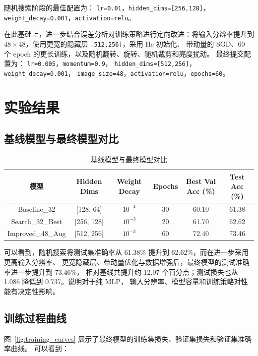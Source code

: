 \documentclass[12pt,a4paper,fontset=none]{ctexart}
\begin{document}
随机搜索阶段的最佳配置为：
\texttt{lr=0.01}，\texttt{hidden\_dims=[256,128]}，
\texttt{weight\_decay=0.001}，\texttt{activation=relu}。

在此基础上，进一步结合误差分析对训练策略进行定向改进：将输入分辨率提升到
$48 \times 48$，使用更宽的隐藏层 \texttt{[512,256]}，采用 He 初始化、
带动量的 SGD、60 个 epoch 的更长训练，以及随机翻转、旋转、随机裁剪和亮度扰动。
最终提交配置为：
\texttt{lr=0.005}，\texttt{momentum=0.9}，
\texttt{hidden\_dims=[512,256]}，\texttt{weight\_decay=0.001}，
\texttt{image\_size=48}，\texttt{activation=relu}，\texttt{epochs=60}。

\section{实验结果}

\subsection{基线模型与最终模型对比}

\begin{table}[htbp]
\centering
\begin{tabular}{|c|c|c|c|c|c|}
\hline
模型 & Hidden Dims & Weight Decay & Epochs & Best Val Acc (\%) & Test Acc (\%) \\
\hline
Baseline\_32 & [128, 64] & $10^{-4}$ & 30 & 60.10 & 61.38 \\
Search\_32\_Best & [256, 128] & $10^{-3}$ & 20 & 61.70 & 62.62 \\
Improved\_48\_Aug & [512, 256] & $10^{-3}$ & 60 & 72.40 & 73.46 \\
\hline
\end{tabular}
\caption{基线模型与最终模型对比}
\label{tab:baseline_final}
\end{table}

可以看到，随机搜索将测试集准确率从 61.38\% 提升到 62.62\%，而在进一步采用更高输入分辨率、
更宽隐藏层、带动量优化与数据增强后，最终模型的测试准确率进一步提升到 73.46\%，
相对基线共提升约 12.07 个百分点；测试损失也从 1.086 降低到 0.737。说明对于纯 MLP，
输入分辨率、模型容量和训练策略对性能有决定性影响。

\subsection{训练过程曲线}

图~\ref{fig:training_curves} 展示了最终模型的训练集损失、验证集损失和验证集准确率曲线。
可以看到：
\end{document}
